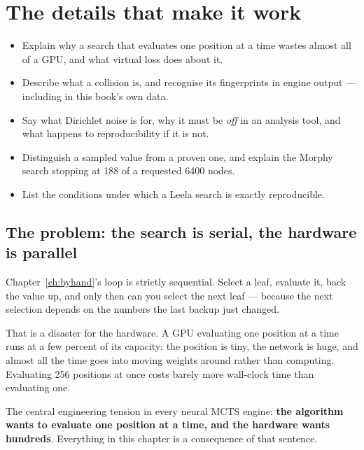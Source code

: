 \chapter{The details that make it work}
\label{ch:engineering}

\begin{objectives}
\begin{itemize}
\item Explain why a search that evaluates one position at a time wastes almost all of a GPU,
  and what virtual loss does about it.
\item Describe what a collision is, and recognise its fingerprints in engine output ---
  including in this book's own data.
\item Say what Dirichlet noise is for, why it must be \emph{off} in an analysis tool, and
  what happens to reproducibility if it is not.
\item Distinguish a sampled value from a proven one, and explain the Morphy search stopping
  at 188 of a requested 6400 nodes.
\item List the conditions under which a Leela search is exactly reproducible.
\end{itemize}
\end{objectives}

\section{The problem: the search is serial, the hardware is parallel}

Chapter~\ref{ch:byhand}'s loop is strictly sequential. Select a leaf, evaluate it, back the
value up, and only then can you select the next leaf --- because the next selection depends
on the numbers the last backup just changed.

That is a disaster for the hardware. A GPU evaluating one position at a time runs at a few
percent of its capacity: the position is tiny, the network is huge, and almost all the time
goes into moving weights around rather than computing. Evaluating 256 positions at once costs
barely more wall-clock time than evaluating one.

\begin{keyidea}
The central engineering tension in every neural MCTS engine: \textbf{the algorithm wants to
evaluate one position at a time, and the hardware wants hundreds}. Everything in this chapter
is a consequence of that sentence.
\end{keyidea}

